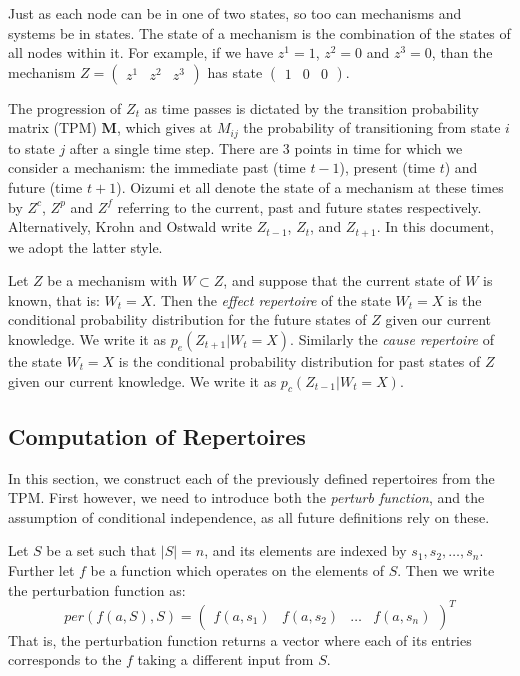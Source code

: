 Just as each node can be in one of two states, so too can mechanisms and systems be in states. The state of a mechanism is the combination of the states of all nodes within it. For example, if we have $z^1=1$, $z^2=0$ and $z^3=0$, than the mechanism $Z = \left(\begin{array}{ccc}z^1&z^2&z^3\end{array}\right)$ has state $\left(\begin{array}{ccc}1&0&0\end{array}\right)$. 


The progression of $Z_t$ as time passes is dictated by the transition probability matrix (TPM) $\mathbf{M}$, which gives at $M_{ij}$ the probability of transitioning from state $i$ to state $j$ after a single time step. There are 3 points in time for which we consider a mechanism: the immediate past (time $t-1$), present (time $t$) and future (time $t+1$). Oizumi et all \cite{oizumi2014phenomenology} denote the state of a mechanism at these times by $Z^c$, $Z^p$ and $Z^f$ referring to the current, past and future states respectively. Alternatively, Krohn and Ostwald \cite{krohn2016computing} write $Z_{t-1}$, $Z_{t}$, and $Z_{t+1}$. In this document, we adopt the latter style.


\begin{definition}
	{Let $Z$ be a mechanism with $W\subset Z$, and suppose that the current state of $W$ is known, that is: $W_t = X$. Then the \textit{effect repertoire} of the state $W_t = X$ is the conditional probability distribution for the future states of $Z$ given our current knowledge. We write it as $p_e(Z_{t+1}|W_t=X)$. Similarly the \textit{cause repertoire} of the state $W_t = X$ is the conditional probability distribution for past states of $Z$ given our current knowledge. We write it as $p_c(Z_{t-1}|W_t = X)$.}
\end{definition}


\subsection{Computation of Repertoires}
\label{sec:cost}
In this section, we construct each of the previously defined repertoires from the TPM. First however, we need to introduce both the \textit{perturb function}, and the assumption of conditional independence, as all future definitions rely on these.

\begin{definition}
	{Let $S$ be a set such that $|S| = n$, and its elements are indexed by $s_1, s_2, \ldots, s_n$. Further let $f$ be a function which operates on the elements of $S$. Then we write the perturbation function as:
	\[per(f(a, S), S) = \left(\begin{array}{cccc}f(a,s_1)&f(a,s_2)&\ldots&f(a,s_n) \end{array}\right)^T\]
	That is, the perturbation function returns a vector where each of its entries corresponds to the $f$ taking a different input from $S$.}
\end{definition} 

